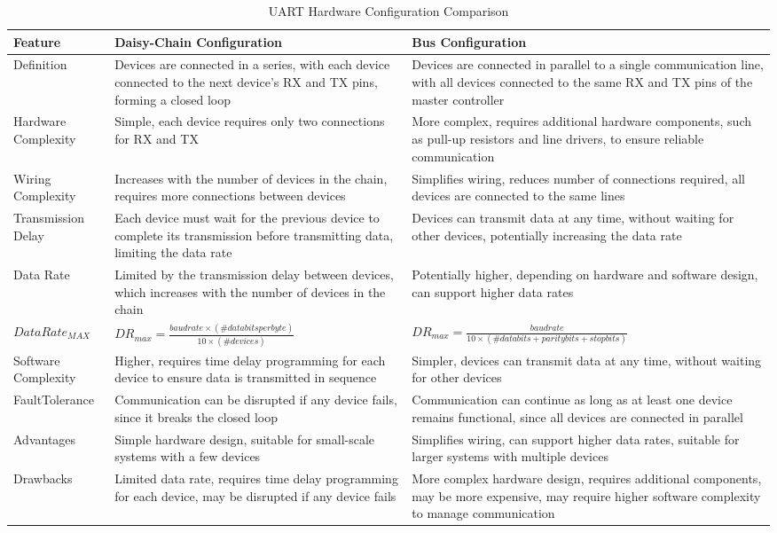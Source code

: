 \begin{table}[h]
\centering
\caption{UART Hardware Configuration Comparison}
\label{tab:UART_comparison}
\begin{tabular}{|p{2.2cm}|p{6.1cm}|p{7cm}|}
\hline
\textbf{Feature} & \textbf{Daisy-Chain Configuration} & \textbf{Bus Configuration} \\
\hline
Definition & Devices are connected in a series, with each device connected to the next device's RX and TX pins, forming a closed loop & Devices are connected in parallel to a single communication line, with all devices connected to the same RX and TX pins of the master controller \\
\hline
Hardware Complexity & Simple, each device requires only two connections for RX and TX & More complex, requires additional hardware components, such as pull-up resistors and line drivers, to ensure reliable communication \\
\hline
Wiring Complexity & Increases with the number of devices in the chain, requires more connections between devices & Simplifies wiring, reduces number of connections required, all devices are connected to the same lines \\
\hline
Transmission Delay & Each device must wait for the previous device to complete its transmission before transmitting data, limiting the data rate & Devices can transmit data at any time, without waiting for other devices, potentially increasing the data rate \\
\hline
Data Rate & Limited by the transmission delay between devices, which increases with the number of devices in the chain & Potentially higher, depending on hardware and software design, can support higher data rates \\ 
\hline
$DataRate_{MAX}$ & $DR_{max} = \frac{baudrate\times(\#data bits per byte)}{10\times(\#devices)}$ & $DR_{max} = \frac{baudrate}{10\times(\#data bits + parity bits + stop bits)}$ \\ 
\hline
Software Complexity & Higher, requires time delay programming for each device to ensure data is transmitted in sequence & Simpler, devices can transmit data at any time, without waiting for other devices \\
\hline
Fault\newline Tolerance & Communication can be disrupted if any device fails, since it breaks the closed loop & Communication can continue as long as at least one device remains functional, since all devices are connected in parallel \\
\hline
Advantages & Simple hardware design, suitable for small-scale systems with a few devices & Simplifies wiring, can support higher data rates, suitable for larger systems with multiple devices \\
\hline
Drawbacks & Limited data rate, requires time delay programming for each device, may be disrupted if any device fails & More complex hardware design, requires additional components, may be more expensive, may require higher software complexity to manage communication \\
\hline
\end{tabular}
\end{table}


